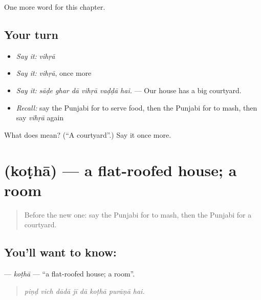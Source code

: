 \begin{grammarlens}[title={What you've built}]
One more word for this chapter.
\end{grammarlens}

\subsection*{Your turn}
\begin{itemize}
\raggedright
  \item \emph{Say it:} \emph{vihṛā}
  \item \emph{Say it:} \emph{vihṛā}, once more
  \item \emph{Say it:} \emph{sāḍe ghar dā vihṛā vaḍḍā hai.} — Our house has a big courtyard.
  \item \emph{Recall:} say the Punjabi for to serve food, then the Punjabi for to mash, then say \emph{vihṛā} again
\end{itemize}

\begin{tcolorbox}[breakable,colback=teal!4,colframe=teal!35!black,title={Before you move on}]
What does  mean? (\textquotedblleft{}A courtyard\textquotedblright{}.) Say it once more.
\end{tcolorbox}
\section[\texorpdfstring{\pa{ਕੋਠਾ} (koṭhā)}{ਕੋਠਾ (koṭhā)}]{ (koṭhā) — a flat-roofed house; a room}

\label{lesson:PA-C245-kotha}



\begin{quote}
Before the new one: say the Punjabi for to mash, then the Punjabi for a courtyard.
\end{quote}

\subsection*{You'll want to know: }
\textbf{} — \emph{koṭhā} — \textquotedblleft{}a flat-roofed house; a room\textquotedblright{}.

\begin{quote}
       
\end{quote}

\begin{quote}
\emph{piṇḍ vich dādā jī dā koṭhā purāṇā hai.}
\end{quote}

